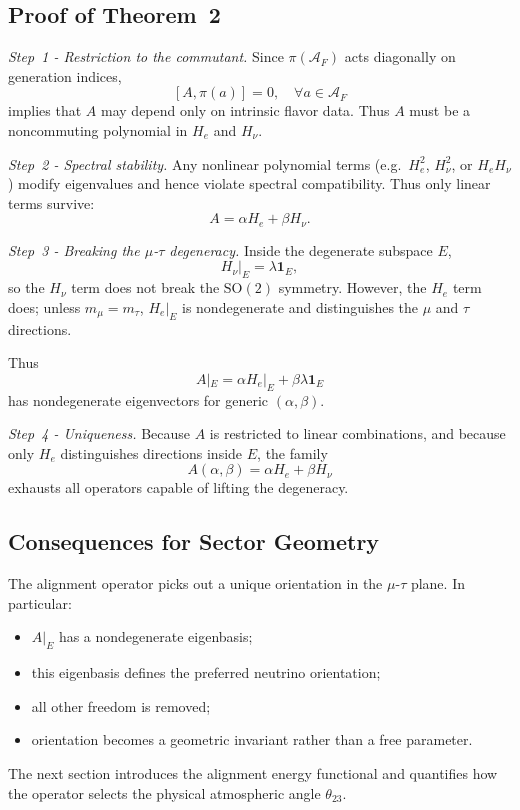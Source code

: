 \subsection[Proof of Theorem 2]{Proof of Theorem~2}

\emph{Step~1 - Restriction to the commutant.}
Since $\pi(\mathcal A_F)$ acts diagonally on generation indices,
\[
[A,\pi(a)] = 0,\quad \forall a\in\mathcal A_F
\]
implies that $A$ may depend only on intrinsic flavor data. Thus $A$ must be a noncommuting polynomial in $H_e$ and $H_\nu$.

\emph{Step~2 - Spectral stability.}
Any nonlinear polynomial terms (e.g.\ $H_e^2$, $H_\nu^2$, or $H_e H_\nu$) modify eigenvalues and hence violate spectral compatibility. Thus only linear terms survive:
\[
A = \alpha H_e + \beta H_\nu.
\]

\emph{Step~3 - Breaking the $\mu$-$\tau$ degeneracy.}
Inside the degenerate subspace $E$,
\[
H_\nu|_E = \lambda \mathbf 1_E,
\]
so the $H_\nu$ term does not break the $\mathrm{SO}(2)$ symmetry. However, the $H_e$ term does; unless $m_\mu = m_\tau$, $H_e|_E$ is nondegenerate and distinguishes the $\mu$ and $\tau$ directions.

Thus
\[
A|_E = \alpha H_e|_E + \beta \lambda \mathbf 1_E
\]
has nondegenerate eigenvectors for generic $(\alpha,\beta)$.

\emph{Step~4 - Uniqueness.}
Because $A$ is restricted to linear combinations, and because only $H_e$ distinguishes directions inside $E$, the family
\[
A(\alpha,\beta)=\alpha H_e+\beta H_\nu
\]
exhausts all operators capable of lifting the degeneracy.

\subsection{Consequences for Sector Geometry}

The alignment operator picks out a unique orientation in the $\mu$-$\tau$ plane. In particular:
\begin{itemize}
\item $A|_E$ has a nondegenerate eigenbasis;
\item this eigenbasis defines the preferred neutrino orientation;
\item all other freedom is removed;
\item orientation becomes a geometric invariant rather than a free parameter.
\end{itemize}

The next section introduces the alignment energy functional and quantifies how the operator selects the physical atmospheric angle $\theta_{23}$.


